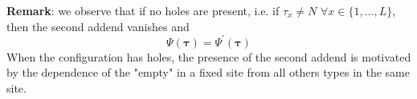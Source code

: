 \documentclass[10pt]{article}
\numberwithin{equation}{section}
\numberwithin{equation}{subsection}
\begin{document}

\newline \newline
	\textbf{Remark}: we observe that if no holes are present, i.e. if $\tau_{x}\neq N$ $\forall x\in \{1,\ldots,L\}$, then the second addend vanishes and
	\begin{equation}\label{LinkABS-corr}
		\Psi(\bm{\tau})=\Psi^{'}(\bm{\tau})
	\end{equation}
	When the configuration has holes, the presence of the second addend is motivated by the dependence of the "empty" in a fixed site from all others types in the same site.
	
\end{document}
